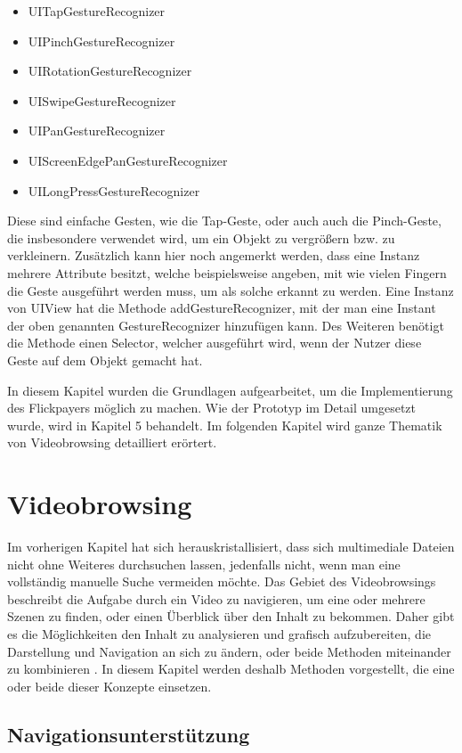 \documentclass[11pt,a4paper]{report}
\begin{document}
\begin{itemize}
\item UITapGestureRecognizer
\item UIPinchGestureRecognizer
\item UIRotationGestureRecognizer
\item UISwipeGestureRecognizer
\item UIPanGestureRecognizer
\item UIScreenEdgePanGestureRecognizer
\item UILongPressGestureRecognizer
\end{itemize}
Diese sind einfache Gesten, wie die Tap-Geste, oder auch auch die Pinch-Geste, die insbesondere verwendet wird, um ein Objekt zu vergrößern bzw. zu verkleinern. Zusätzlich kann hier noch angemerkt werden, dass eine Instanz mehrere Attribute besitzt, welche beispielsweise angeben, mit wie vielen Fingern die Geste ausgeführt werden muss, um als solche erkannt zu werden. Eine Instanz von UIView hat die Methode addGestureRecognizer, mit der man eine Instant der oben genannten GestureRecognizer hinzufügen kann. Des Weiteren benötigt die Methode einen Selector, welcher ausgeführt wird, wenn der Nutzer diese Geste auf dem Objekt gemacht hat. \cite{UIGestureRecognizerClass}

In diesem Kapitel wurden die Grundlagen aufgearbeitet, um die Implementierung des Flickpayers möglich zu machen. Wie der Prototyp im Detail umgesetzt wurde, wird in Kapitel 5 behandelt. Im folgenden Kapitel wird ganze Thematik von Videobrowsing detailliert erörtert.

\chapter{Videobrowsing}

Im vorherigen Kapitel hat sich herauskristallisiert, dass sich multimediale Dateien nicht ohne Weiteres durchsuchen lassen, jedenfalls nicht, wenn man eine vollständig manuelle Suche vermeiden möchte. Das Gebiet des Videobrowsings beschreibt die Aufgabe durch ein Video zu navigieren, um eine oder mehrere Szenen zu finden, oder einen Überblick über den Inhalt zu bekommen. Daher gibt es die Möglichkeiten den Inhalt zu analysieren und grafisch aufzubereiten, die Darstellung und Navigation an sich zu ändern, oder beide Methoden miteinander zu kombinieren \cite{juengling2014videozoom}. In diesem Kapitel werden deshalb Methoden vorgestellt, die eine oder beide dieser Konzepte einsetzen.

\section{Navigationsunterstützung}
\end{document}
